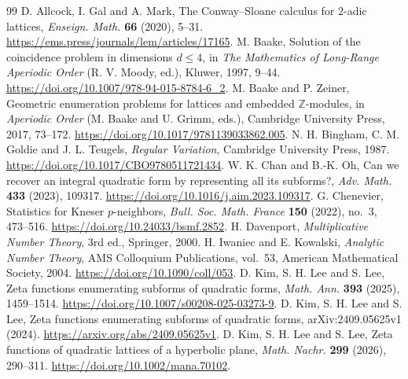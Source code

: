 \documentclass[11pt]{article}
\theoremstyle{remark}\newtheorem{remark}[theorem]{Remark}
\begin{document}






















\begin{thebibliography}{99}
 D. Allcock, I. Gal and A. Mark, The Conway--Sloane calculus for $2$-adic lattices, \emph{Enseign. Math.} \textbf{66} (2020), 5--31. \url{https://ems.press/journals/lem/articles/17165}.
 M. Baake, Solution of the coincidence problem in dimensions $d\le4$, in \emph{The Mathematics of Long-Range Aperiodic Order} (R. V. Moody, ed.), Kluwer, 1997, 9--44. \url{https://doi.org/10.1007/978-94-015-8784-6_2}.
 M. Baake and P. Zeiner, Geometric enumeration problems for lattices and embedded $\mathbb Z$-modules, in \emph{Aperiodic Order} (M. Baake and U. Grimm, eds.), Cambridge University Press, 2017, 73--172. \url{https://doi.org/10.1017/9781139033862.005}.
 N. H. Bingham, C. M. Goldie and J. L. Teugels, \emph{Regular Variation}, Cambridge University Press, 1987. \url{https://doi.org/10.1017/CBO9780511721434}.
 W. K. Chan and B.-K. Oh, Can we recover an integral quadratic form by representing all its subforms?, \emph{Adv. Math.} \textbf{433} (2023), 109317. \url{https://doi.org/10.1016/j.aim.2023.109317}.
 G. Chenevier, Statistics for Kneser $p$-neighbors, \emph{Bull. Soc. Math. France} \textbf{150} (2022), no.~3, 473--516. \url{https://doi.org/10.24033/bsmf.2852}.
 H. Davenport, \emph{Multiplicative Number Theory}, 3rd ed., Springer, 2000.
 H. Iwaniec and E. Kowalski, \emph{Analytic Number Theory}, AMS Colloquium Publications, vol.~53, American Mathematical Society, 2004. \url{https://doi.org/10.1090/coll/053}.
 D. Kim, S. H. Lee and S. Lee, Zeta functions enumerating subforms of quadratic forms, \emph{Math. Ann.} \textbf{393} (2025), 1459--1514. \url{https://doi.org/10.1007/s00208-025-03273-9}.
 D. Kim, S. H. Lee and S. Lee, Zeta functions enumerating subforms of quadratic forms, arXiv:2409.05625v1 (2024). \url{https://arxiv.org/abs/2409.05625v1}.
 D. Kim, S. H. Lee and S. Lee, Zeta functions of quadratic lattices of a hyperbolic plane, \emph{Math. Nachr.} \textbf{299} (2026), 290--311. \url{https://doi.org/10.1002/mana.70102}.

\end{thebibliography}
\end{document}
